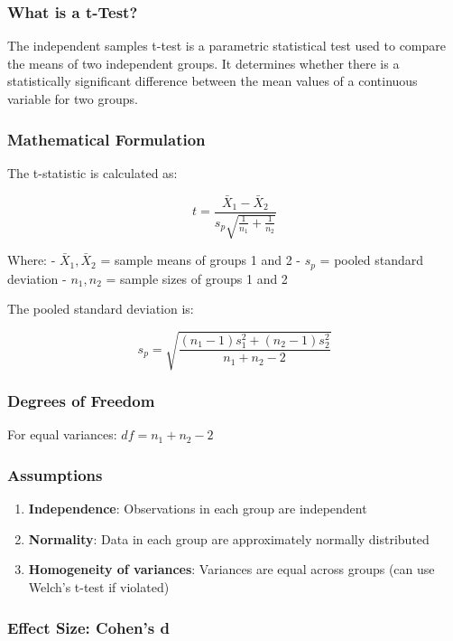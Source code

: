 \documentclass[11pt]{article}
\providecommand{\tightlist}{%
      \setlength{\itemsep}{0pt}\setlength{\parskip}{0pt}}
\begin{document}
\subsubsection{What is a t-Test?}\label{what-is-a-t-test}

The independent samples t-test is a parametric statistical test used to
compare the means of two independent groups. It determines whether there
is a statistically significant difference between the mean values of a
continuous variable for two groups.

\subsubsection{Mathematical Formulation}\label{mathematical-formulation}

The t-statistic is calculated as:

\[t = \frac{\bar{X}_1 - \bar{X}_2}{s_p \sqrt{\frac{1}{n_1} + \frac{1}{n_2}}}\]

Where: - \(\bar{X}_1, \bar{X}_2\) = sample means of groups 1 and 2 -
\(s_p\) = pooled standard deviation - \(n_1, n_2\) = sample sizes of
groups 1 and 2

The pooled standard deviation is:

\[s_p = \sqrt{\frac{(n_1-1)s_1^2 + (n_2-1)s_2^2}{n_1 + n_2 - 2}}\]

\subsubsection{Degrees of Freedom}\label{degrees-of-freedom}

For equal variances: \(df = n_1 + n_2 - 2\)

\subsubsection{Assumptions}\label{assumptions}

\begin{enumerate}
\def\labelenumi{\arabic{enumi}.}
\tightlist
\item
  \textbf{Independence}: Observations in each group are independent
\item
  \textbf{Normality}: Data in each group are approximately normally
  distributed
\item
  \textbf{Homogeneity of variances}: Variances are equal across groups
  (can use Welch's t-test if violated)
\end{enumerate}

\subsubsection{Effect Size: Cohen's d}\label{effect-size-cohens-d}
\end{document}
